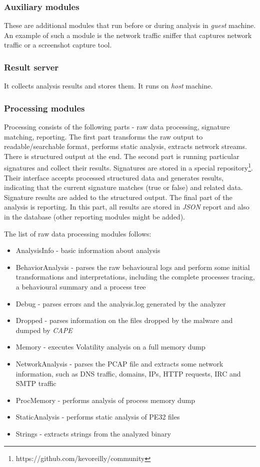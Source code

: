 \subsubsection*{Auxiliary modules}
These are additional modules that run before or during analysis in \emph{guest} machine. An example of such a module is the network traffic sniffer that captures network traffic or a screenshot capture tool.

\subsubsection*{Result server}
It collects analysis results and stores them. It runs on \emph{host} machine.

\subsubsection*{Processing modules}
Processing consists of the following parts - raw data processing, signature matching, reporting. The first part transforms the raw output to readable/searchable format, performs static analysis, extracts network streams. There is structured output at the end. The second part is running particular signatures and collect their results. Signatures are stored in a special repository\footnote{https://github.com/kevoreilly/community}. Their interface accepts processed structured data and generates results, indicating that the current signature matches (true or false) and related data. Signature results are added to the structured output. The final part of the analysis is reporting. In this part, all results are stored in \emph{JSON} report and also in the database (other reporting modules might be added).

The list of raw data processing modules follows:
\begin{itemize}
  \item AnalysisInfo - basic information about analysis
  \item BehaviorAnalysis - parses the raw behavioural logs and perform some initial transformations and interpretations, including the complete processes tracing, a behavioural summary and a process tree
  \item Debug - parses errors and the analysis.log generated by the analyzer
  \item Dropped - parses information on the files dropped by the malware and dumped by \emph{CAPE}
  \item Memory - executes Volatility analysis on a full memory dump
  \item NetworkAnalysis - parses the PCAP file and extracts some network information, such as DNS traffic, domains, IPs, HTTP requests, IRC and SMTP traffic
  \item ProcMemory - performs analysis of process memory dump
  \item StaticAnalysis - performs static analysis of PE32 files
  \item Strings - extracts strings from the analyzed binary
\end{itemize}

